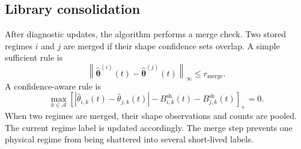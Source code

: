 \documentclass[11pt]{article}
\newcommand{\A}{\mathcal A}
\newcommand{\norm}[1]{\left\lVert #1 \right\rVert}
\newcommand{\abs}[1]{\left\lvert #1 \right\rvert}
\newcommand{\pos}[1]{\left[#1\right]_{+}}
\begin{document}
\subsection{Library consolidation}
\label{subsec:library_consolidation}

After diagnostic updates, the algorithm performs a merge check. Two stored regimes $i$ and $j$ are merged if their shape confidence sets overlap. A simple sufficient rule is
\begin{equation}
\label{eq:simple_merge_rule}
\norm{\widehat{\bm\theta}^{(i)}(t)-
\widehat{\bm\theta}^{(j)}(t)}_{\infty}
\leq r_{\mathrm{merge}}.
\end{equation}
A confidence-aware rule is
\begin{equation}
\label{eq:confidence_merge_rule}
\max_{k\in\A}
\pos{
\abs{\widehat\theta_{i,k}(t)-\widehat\theta_{j,k}(t)}
-
B_{i,k}^{\mathrm{sh}}(t)
-
B_{j,k}^{\mathrm{sh}}(t)
}
=0.
\end{equation}
When two regimes are merged, their shape observations and counts are pooled. The current regime label is updated accordingly. The merge step prevents one physical regime from being shattered into several short-lived labels.
\end{document}
